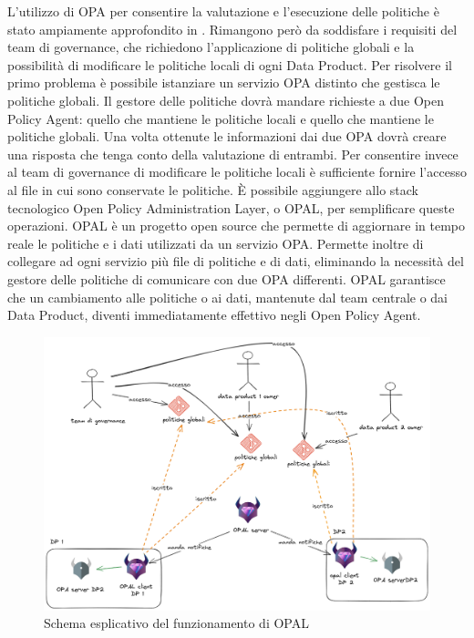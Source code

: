 \documentclass[12pt]{report}
\begin{document}
L'utilizzo di OPA per consentire la valutazione e l'esecuzione delle politiche è stato ampiamente approfondito in \cite{tesi_opa_polimi}.
Rimangono però da soddisfare i requisiti del team di governance, che richiedono l'applicazione di politiche globali e la possibilità di modificare le politiche locali di ogni Data Product.
Per risolvere il primo problema è possibile istanziare un servizio OPA distinto che gestisca le politiche globali.
Il gestore delle politiche dovrà mandare richieste a due Open Policy Agent: quello che mantiene le politiche locali e quello che mantiene le politiche globali.
Una volta ottenute le informazioni dai due OPA dovrà creare una risposta che tenga conto della valutazione di entrambi.
Per consentire invece al team di governance di modificare le politiche locali è sufficiente fornire l'accesso al file in cui sono conservate le politiche.
È possibile aggiungere allo stack tecnologico Open Policy Administration Layer, o OPAL, per semplificare queste operazioni.
OPAL è un progetto open source che permette di aggiornare in tempo reale le politiche e i dati utilizzati da un servizio OPA.
Permette inoltre di collegare ad ogni servizio più file di politiche e di dati, eliminando la necessità del gestore delle politiche di comunicare con due OPA differenti.
OPAL garantisce che un cambiamento alle politiche o ai dati, mantenute dal team centrale o dai Data Product, diventi immediatamente effettivo negli Open Policy Agent.
\begin{figure}[H]
    \centering
    \includegraphics[width=\linewidth]{immagini/OPAL funzionamento.png}
    \caption{Schema esplicativo del funzionamento di OPAL}
    \label{funzionamento_OPAL}
\end{figure}
\end{document}
